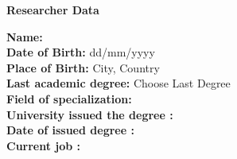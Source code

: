 \cleardoublepage
\newpage
\thispagestyle{empty}

\begin{center}\huge \textbf{Researcher Data}\end{center}
\vspace{3em}
\begin{flushleft}
\textbf{Name:} \\

\textbf{Date of Birth:} dd/mm/yyyy \\

\textbf{Place of Birth:} City, Country \\

\textbf{Last academic degree:} Choose Last Degree \\

\textbf{Field of specialization:}  \\

\textbf{University issued the degree	:}  \\

\textbf{Date of issued degree	:}  \\


\textbf{Current job		:}  \\

\end{flushleft}
\vfill



